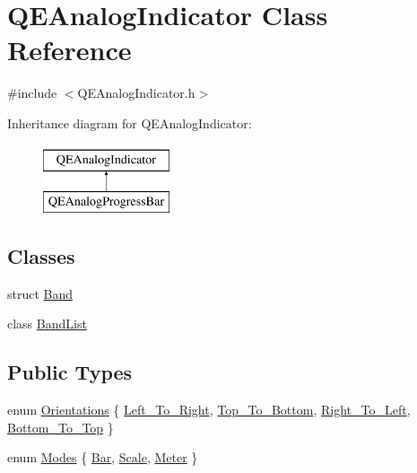 \hypertarget{classQEAnalogIndicator}{
\section{QEAnalogIndicator Class Reference}
\label{classQEAnalogIndicator}
}


{\ttfamily \#include $<$QEAnalogIndicator.h$>$}

Inheritance diagram for QEAnalogIndicator:\begin{figure}[H]
\begin{center}
\leavevmode
\includegraphics[height=2.000000cm]{classQEAnalogIndicator}
\end{center}
\end{figure}
\subsection*{Classes}
\begin{DoxyCompactItemize}
\item 
struct \hyperlink{structQEAnalogIndicator_1_1Band}{Band}
\item 
class \hyperlink{classQEAnalogIndicator_1_1BandList}{BandList}
\end{DoxyCompactItemize}
\subsection*{Public Types}
\begin{DoxyCompactItemize}
\item 
enum \hyperlink{classQEAnalogIndicator_a61edf87791775f2c2e203f93ab4ebfbc}{Orientations} \{ \hyperlink{classQEAnalogIndicator_a61edf87791775f2c2e203f93ab4ebfbcae2aad92dc05cf59a5bc78c6b1f3443eb}{Left\_\-To\_\-Right}, 
\hyperlink{classQEAnalogIndicator_a61edf87791775f2c2e203f93ab4ebfbca76c9cb80937b37d78b1a0a1b8201fa66}{Top\_\-To\_\-Bottom}, 
\hyperlink{classQEAnalogIndicator_a61edf87791775f2c2e203f93ab4ebfbcac8d11ea24ddbb3b57fed45c74b071cc8}{Right\_\-To\_\-Left}, 
\hyperlink{classQEAnalogIndicator_a61edf87791775f2c2e203f93ab4ebfbca29f286d5bbb01a653565db49f33db34c}{Bottom\_\-To\_\-Top}
 \}
\item 
enum \hyperlink{classQEAnalogIndicator_a3f42266f1b130ee612e6187fd146a724}{Modes} \{ \hyperlink{classQEAnalogIndicator_a3f42266f1b130ee612e6187fd146a724a4be72d6b96cfbbb8c0ad7efb5da6360b}{Bar}, 
\hyperlink{classQEAnalogIndicator_a3f42266f1b130ee612e6187fd146a724a8b1456174555ea28c6a5e5c2b8a6f3de}{Scale}, 
\hyperlink{classQEAnalogIndicator_a3f42266f1b130ee612e6187fd146a724ab3a2b4d488bfdfe1864c171c44d8d214}{Meter}
 \}
\end{DoxyCompactItemize}
